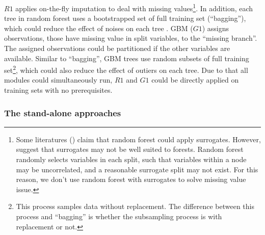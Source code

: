 \noindent $R1$ applies on-the-fly imputation to deal with missing values\footnote{Some literatures (\citealp[see samples][]{Hapfelmeier2012, hapfelmeier_etal14}) claim that random forest could apply surrogates. However, \citet{Ishwaran2008} suggest that surrogates may not be well suited to forests. Random forest randomly selects variables in each split, such that variables within a node may be uncorrelated, and a reasonable surrogate split may not exist. For this reason, we don't use random forest with surrogates to solve missing value issue.}. In addition, each tree in random forest uses a bootstrapped set of full training set (``bagging''), which could reduce the effect of noises on each tree \citep{Dietterich2000}. GBM ($G1$) assigns observations, those have missing value in split variables, to the ``missing branch''. The assigned observations could be partitioned if the other variables are available. Similar to ``bagging'', GBM trees use random subsets of full training set\footnote{This process samples data without replacement. The difference between this process and ``bagging'' is whether the subsampling process is with replacement or not.}, which could also reduce the effect of outiers on each tree. Due to that all modules could simultaneously run, $R1$ and $G1$ could be directly applied on training sets with no prerequisites.

\subsubsection*{The stand-alone approaches}

